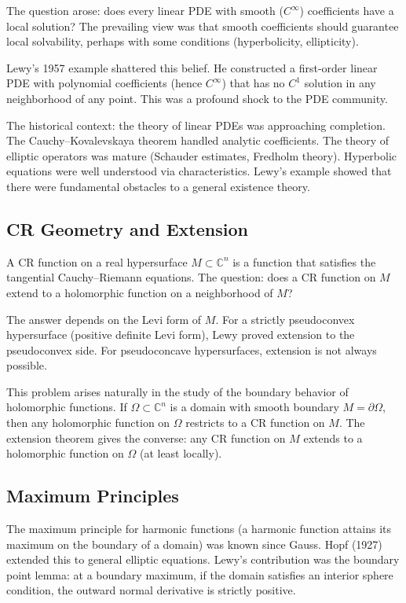 The question arose: does every linear PDE with smooth ($C^\infty$) coefficients have a local solution? The prevailing view was that smooth coefficients should guarantee local solvability, perhaps with some conditions (hyperbolicity, ellipticity).

Lewy's 1957 example shattered this belief. He constructed a first-order linear PDE with polynomial coefficients (hence $C^\infty$) that has no $C^1$ solution in any neighborhood of any point. This was a profound shock to the PDE community.

The historical context: the theory of linear PDEs was approaching completion. The Cauchy--Kovalevskaya theorem handled analytic coefficients. The theory of elliptic operators was mature (Schauder estimates, Fredholm theory). Hyperbolic equations were well understood via characteristics. Lewy's example showed that there were fundamental obstacles to a general existence theory.

\subsection{CR Geometry and Extension}

A CR function on a real hypersurface $M \subset \mathbb{C}^n$ is a function that satisfies the tangential Cauchy--Riemann equations. The question: does a CR function on $M$ extend to a holomorphic function on a neighborhood of $M$?

The answer depends on the Levi form of $M$. For a strictly pseudoconvex hypersurface (positive definite Levi form), Lewy proved extension to the pseudoconvex side. For pseudoconcave hypersurfaces, extension is not always possible.

This problem arises naturally in the study of the boundary behavior of holomorphic functions. If $\Omega \subset \mathbb{C}^n$ is a domain with smooth boundary $M = \partial \Omega$, then any holomorphic function on $\Omega$ restricts to a CR function on $M$. The extension theorem gives the converse: any CR function on $M$ extends to a holomorphic function on $\Omega$ (at least locally).

\subsection{Maximum Principles}

The maximum principle for harmonic functions (a harmonic function attains its maximum on the boundary of a domain) was known since Gauss. Hopf (1927) extended this to general elliptic equations. Lewy's contribution was the boundary point lemma: at a boundary maximum, if the domain satisfies an interior sphere condition, the outward normal derivative is strictly positive.

